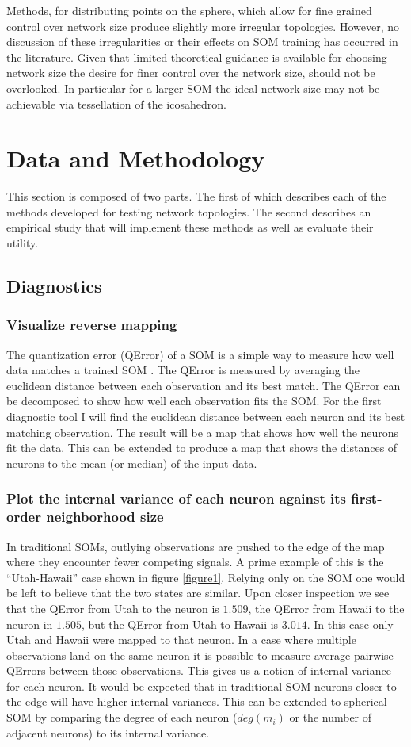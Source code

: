 \documentclass[10pt,titlepage]{article}
\begin{document}
Methods, for distributing points on the sphere, which allow for fine grained
control over network size produce slightly more irregular topologies.  However,
no discussion of these irregularities or their effects on SOM training has
occurred in the literature. Given that limited theoretical guidance is available
for choosing network size the desire for finer control over the network size,
should not be overlooked. In particular for a larger SOM the ideal network size
may not be achievable via tessellation of the icosahedron.

\section{Data and Methodology}
This section is composed of two parts.  The first of which describes each of
the methods developed for testing network topologies.  The second describes an
empirical study that will implement these methods as well as evaluate their
utility. 

\subsection{Diagnostics}
\subsubsection{Visualize reverse mapping}
The quantization error (QError) of a SOM is a simple way to measure how well 
data matches a trained SOM \citep{Kohonen2000}. The QError is measured by averaging
the euclidean distance between each observation and its best match.  The QError can
be decomposed to show how well each observation fits the SOM.  For the first
diagnostic tool I will find the euclidean distance between each neuron and its
best matching observation.  The result will be a map that shows how well the
neurons fit the data. This can be extended to produce a map that shows the
distances of neurons to the mean (or median) of the input data.

\subsubsection{Plot the internal variance of each neuron against its first-order neighborhood size}
In traditional SOMs, outlying observations are pushed to the edge of the map where
they encounter fewer competing signals. A prime example of this is the
``Utah-Hawaii'' case shown in figure \ref{figure1}.  Relying only on the SOM one
would be left to believe that the two states are similar. Upon closer inspection we see
that the QError from Utah to the neuron is $1.509$, the QError from Hawaii to
the neuron in $1.505$, but the QError from Utah to Hawaii is $3.014$. In this
case only Utah and Hawaii were mapped to that neuron.  In a case where multiple
observations land on the same neuron it is possible to measure average pairwise
QErrors between those observations.  This gives us a notion of internal variance for
each neuron. It would be expected that in traditional SOM neurons closer to the
edge will have higher internal variances. This can be extended to spherical SOM
by comparing the degree of each neuron ($deg(m_i)$ or the number of adjacent
neurons) to its internal variance.
\end{document}
